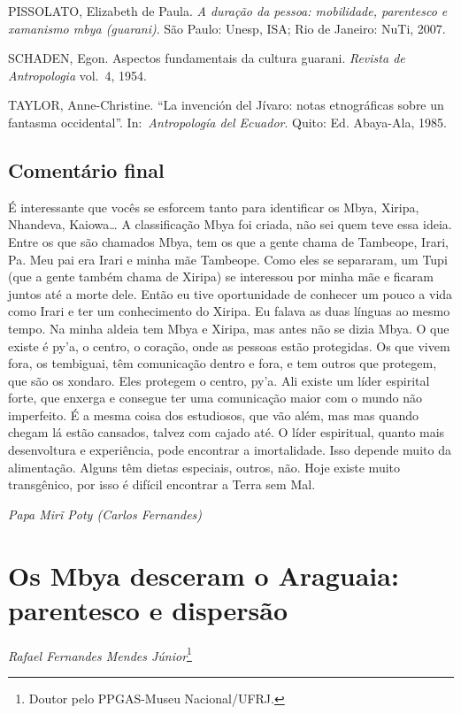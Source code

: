 PISSOLATO, Elizabeth de Paula. \emph{A duração da pessoa: mobilidade,
parentesco e xamanismo mbya (guarani)}. São Paulo: Unesp, ISA; Rio de
Janeiro: NuTi, 2007.

SCHADEN, Egon. Aspectos fundamentais da cultura guarani. \emph{Revista de
Antropologia} vol.~4, 1954.

TAYLOR, Anne-Christine. ``La invención del Jívaro: notas etnográficas
sobre un fantasma occidental''. In:~\emph{Antropología del Ecuador}. Quito: Ed.
Abaya-Ala, 1985.

\section{Comentário final}
É interessante que vocês se esforcem tanto para identificar os Mbya,
Xiripa, Nhandeva, Kaiowa\ldots{} A classificação Mbya foi criada, não sei
quem teve essa ideia. Entre os que são chamados Mbya, tem os que a
gente chama de Tambeope, Irari, Pa. Meu pai era Irari e
minha mãe Tambeope. Como eles se separaram, um Tupi (que a gente também
chama de Xiripa) se interessou por minha mãe e ficaram juntos até a
morte dele. Então eu tive oportunidade de conhecer um pouco a vida como
Irari e ter um conhecimento do Xiripa. Eu falava as duas línguas ao
mesmo tempo. Na minha aldeia tem Mbya e Xiripa, mas antes não se dizia
Mbya. O que existe é py’a, o centro, o coração, onde as pessoas estão
protegidas. Os que vivem fora, os tembiguai, têm comunicação dentro e
fora, e tem outros que protegem, que são os xondaro. Eles protegem o
centro, py’a. Ali existe um líder espirital forte, que enxerga e
consegue ter uma comunicação maior com o mundo não imperfeito. É a
mesma coisa dos estudiosos, que vão além, mas mas quando chegam lá
estão cansados, talvez com cajado até. O líder espiritual, quanto mais
desenvoltura e experiência, pode encontrar a imortalidade. Isso depende
muito da alimentação. Alguns têm dietas especiais, outros, não. Hoje
existe muito transgênico, por isso é difícil encontrar a Terra sem Mal.
\medskip
\begin{flushright}
\emph{Papa Mir\~{i} Poty (Carlos Fernandes)} 
\end{flushright}

\chapter{Os Mbya desceram o Araguaia: parentesco e dispersão}
\begin{flushright}
\emph{Rafael Fernandes Mendes Júnior}\footnote{Doutor pelo PPGAS-Museu
Nacional/UFRJ.}
\end{flushright}
\medskip

